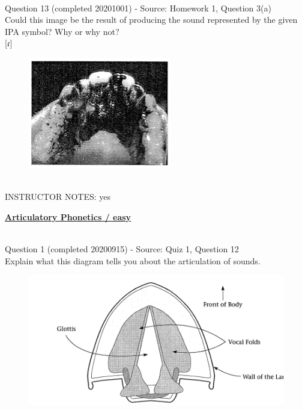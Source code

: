 \documentclass[12pt]{article}
\begin{document}
~\\

{\large Question 13} (completed 20201001) - Source: Homework 1, Question 3(a)\\

Could this image be the result of producing the sound represented by the given IPA symbol? Why or why not?\\

{[ɾ]}

\begin{figure}[H]
\includegraphics{../images/staticpalatography_stop.png}
\end{figure}

~\\
INSTRUCTOR NOTES: yes


\newpage\textbf{\underline{\huge Articulatory Phonetics / easy\\}}

~\\

{\large Question 1} (completed 20200915) - Source: Quiz 1, Question 12\\

Explain what this diagram tells you about the articulation of sounds.\\

\begin{figure}[H]
\includegraphics{../images/spreadglottis_diagram.png}
\end{figure}
\end{document}
